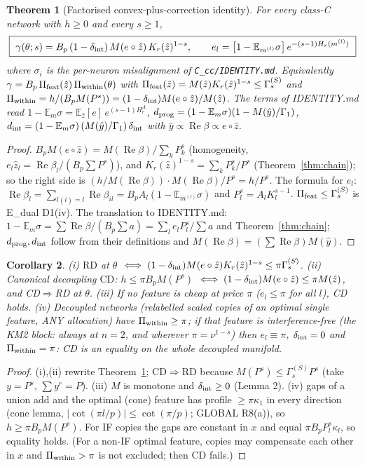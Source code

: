 \documentclass[11pt]{article}
\newtheorem{theorem}{Theorem}
\newtheorem{corollary}[theorem]{Corollary}
\theoremstyle{definition}
\newcommand{\Re}{\operatorname{Re}}
\begin{document}
\begin{theorem}[Factorised convex-plus-correction identity]\label{thm:fact}
For every class-C network with $h\ge0$ and every $s\ge1$,
\[
\boxed{\ \gamma(\theta;s)=B_p\,(1-\delta_{\rm int})\,M(e\circ\hat z)\,K_r(\hat z)^{1-s},\qquad
e_l=\big[1-\mathbb E_{m^{(l)}}\sigma\big]\,e^{-(s-1)H_r(m^{(l)})}\ }
\]
where $\sigma_i$ is the per-neuron misalignment of \texttt{C\_cc/IDENTITY.md}. Equivalently
$\gamma=B_p\,\Pi_{\rm feat}(\hat z)\,\Pi_{\rm within}(\theta)$ with $\Pi_{\rm feat}(\hat z)=M(\hat z)K_r(\hat z)^{1-s}\le\Gamma^{(S)}_s$ and
$\Pi_{\rm within}=h/(B_pM(P^s))=(1-\delta_{\rm int})M(e\circ\hat z)/M(\hat z)$. The terms of IDENTITY.md read
$1-\mathbb E_m\sigma=\mathbb E_{\hat z}[e]\,e^{(s-1)H^A_r}$, $d_{\rm prog}=(1-\mathbb E_m\sigma)(1-M(\hat y)/\Gamma_1)$,
$d_{\rm int}=(1-\mathbb E_m\sigma)\,(M(\hat y)/\Gamma_1)\,\delta_{\rm int}$ with $\hat y\propto\Re\beta\propto e\circ\hat z$.
\end{theorem}
\begin{proof}
$B_pM(e\circ\hat z)=M(\Re\beta)/\sum_kP_k^s$ (homogeneity, $e_l\hat z_l=\Re\beta_l/(B_p\sum P^s)$), and
$K_r(\hat z)^{1-s}=\sum_kP_k^s/P^s$ (Theorem~\ref{thm:chain}); so the right side is $(h/M(\Re\beta))\cdot M(\Re\beta)/P^s=h/P^s$.
The formula for $e_l$: $\Re\beta_l=\sum_{l(i)=l}\Re\beta_{il}=B_pA_l(1-\mathbb E_{m^{(l)}}\sigma)$ and $P_l^s=A_lK_l^{s-1}$.
$\Pi_{\rm feat}\le\Gamma^{(S)}_s$ is E\_dual D1(iv). The translation to IDENTITY.md: $1-\mathbb E_m\sigma=\sum\Re\beta/(B_p\sum a)
=\sum_le_lP_l^s/\sum a$ and Theorem~\ref{thm:chain}; $d_{\rm prog},d_{\rm int}$ follow from their definitions and
$M(\Re\beta)=(\sum\Re\beta)M(\hat y)$.
\end{proof}

\begin{corollary}\label{cor:nocheap}
(i) $\mathrm{RD}$ at $\theta$ $\iff(1-\delta_{\rm int})M(e\circ\hat z)K_r(\hat z)^{1-s}\le\pi\Gamma^{(S)}_s$.
(ii) Canonical decoupling $\mathrm{CD}$: $h\le\pi B_pM(P^s)$ $\iff(1-\delta_{\rm int})M(e\circ\hat z)\le\pi M(\hat z)$, and CD$\Rightarrow$RD at $\theta$.
(iii) If no feature is cheap at price $\pi$ ($e_l\le\pi$ for all $l$), CD holds.
(iv) Decoupled networks (relabelled scaled copies of an optimal single feature, ANY allocation) have $\Pi_{\rm within}\ge\pi$;
if that feature is interference-free (the KM2 block: always at $n=2$, and wherever $\pi=\nu^{1-s}$) then $e_l\equiv\pi$,
$\delta_{\rm int}=0$ and $\Pi_{\rm within}=\pi$: CD is an equality on the whole decoupled manifold.
\end{corollary}
\begin{proof} (i),(ii) rewrite Theorem~\ref{thm:fact}; CD$\Rightarrow$RD because $M(P^s)\le\Gamma^{(S)}_sP^s$
(take $y=P^s$, $\sum y^r=P$). (iii) $M$ is monotone and $\delta_{\rm int}\ge0$ (Lemma 2). (iv) gaps of a union add and the
optimal (cone) feature has profile $\ge\pi\kappa_1$ in every direction (cone lemma, $|\cot(\pi l/p)|\le\cot(\pi/p)$; GLOBAL R8(a)),
so $h\ge\pi B_pM(P^s)$. For IF copies the gaps are constant in $x$ and equal $\pi B_pP_l^s\kappa_l$, so equality holds. (For a
non-IF optimal feature, copies may compensate each other in $x$ and $\Pi_{\rm within}>\pi$ is not excluded; then CD fails.)\end{proof}
\end{document}

